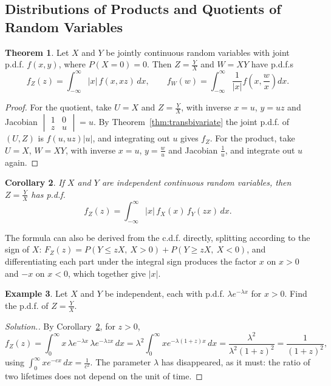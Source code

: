 \documentclass[12pt,a4paper]{report}
\theoremstyle{definition}
\newtheorem{thm}{Theorem}[section]
\newtheorem{example}[thm]{Example}
\theoremstyle{plain}
\newtheorem{coro}[thm]{Corollary}
\newenvironment{solution}
  {\renewcommand{\qedsymbol}{}\begin{proof}[\textit{Solution}.]}
  {\end{proof}}
\begin{document}
\subsection{Distributions of Products and Quotients of Random Variables}

\begin{thm}
\label{thm:prodquot}
Let $X$ and $Y$ be jointly continuous random variables with joint p.d.f.
$f(x,y)$, where $P(X = 0) = 0$. Then $Z=\frac{Y}{X}$ and $W = XY$ have p.d.f.s
\[f_Z(z) = \int_{-\infty}^\infty |x|\,f(x,xz)\,dx ,\qquad f_W(w) =
\int_{-\infty}^\infty\frac{1}{|x|}f\left(x,\frac{w}{x}\right)dx .\]
\end{thm}

\begin{proof}
For the quotient, take $U = X$ and $Z = \frac{Y}{X}$, with inverse $x = u$,
$y = uz$ and Jacobian $\begin{vmatrix}1 & 0\\ z & u\end{vmatrix} = u$. By
Theorem~\ref{thm:transbivariate} the joint p.d.f. of $(U,Z)$ is
$f(u,uz)|u|$, and integrating out $u$ gives $f_Z$. For the product, take
$U = X$, $W = XY$, with inverse $x = u$, $y = \frac{w}{u}$ and Jacobian
$\frac1u$, and integrate out $u$ again.
\end{proof}

\begin{coro}
\label{cor:quotientindep}
If $X$ and $Y$ are independent continuous random variables, then
$Z = \frac{Y}{X}$ has p.d.f.
\[f_Z(z) = \int^{\infty}_{-\infty}|x|\, f_X(x)\,f_Y(zx)\, dx .\]
\end{coro}

The formula can also be derived from the c.d.f. directly, splitting according to
the sign of $X$: $F_Z(z) = P(Y\leq zX,\ X>0) + P(Y\geq zX,\ X<0)$, and
differentiating each part under the integral sign produces the factor $x$ on
$x>0$ and $-x$ on $x<0$, which together give $|x|$.

\begin{example}
\label{ex:expratio}
Let $X$ and $Y$ be independent, each with p.d.f. $\lambda e^{-\lambda x}$ for
$x > 0$. Find the p.d.f. of $Z = \frac{Y}{X}$.
\end{example}

\begin{solution}
By Corollary~\ref{cor:quotientindep}, for $z>0$,
\[f_Z(z) = \int^{\infty}_0x\,\lambda e^{-\lambda x}\,\lambda e^{-\lambda zx}\,
dx = \lambda^2\int^{\infty}_0xe^{-\lambda(1 + z)x}\, dx = \frac{\lambda^2}{\lambda^2
(1 + z)^2} = \frac{1}{(1+z)^2} ,\]
using $\int_0^\infty xe^{-cx}\,dx = \frac{1}{c^2}$. The parameter $\lambda$ has
disappeared, as it must: the ratio of two lifetimes does not depend on the unit
of time.
\end{solution}
\end{document}
